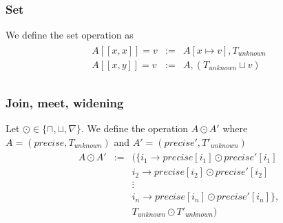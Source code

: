 \documentclass[10pt,a4paper,final]{article}
\begin{document}
\subsubsection{Set}
We define the set operation as
\begin{align}
\begin{array}{rcl}
A[[x,x]] = v &:=& A[x \mapsto v], T_{unknown} \\
A[[x,y]] = v &:=& A, (T_{unknown} \sqcup v) \\
\end{array}
\end{align}
\subsubsection{Join, meet, widening}
Let $\odot \in \{\sqcap, \sqcup, \nabla\}$.
We define the operation $A \odot A'$ where $A = (precise, T_{unknown})$ and $A' = (precise', T'_{unknown})$
\begin{align}
\begin{array}{rcl}
A \odot A' &:=& (\{ i_1 \rightarrow precise[i_1] \odot precise'[i_1] \\
&& i_2 \rightarrow precise[i_2] \odot precise'[i_2]\\
&& \vdots\\
&& i_n \rightarrow precise[i_n] \odot precise'[i_n]\},\\
&& T_{unknown} \odot T'_{unknown})\\
\end{array}
\end{align}
\end{document}
